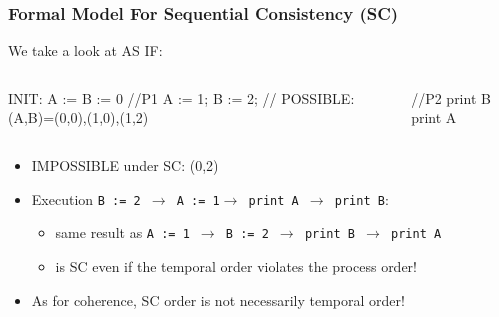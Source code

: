 \documentclass{beamer}
\renewcommand{\emph}[1]{\textcolor{structure}{#1}}
\newcommand{\emp}[1]{\textcolor{DikuRed}{ #1}}
\begin{document}
\begin{frame}[fragile,t]
\frametitle{Formal Model For Sequential Consistency (SC)}

\begin{block}{We take a look at AS IF:}
\begin{columns}
\vspace{-2ex}
\begin{colorcode}[fontsize=\scriptsize]
        INIT: A := B := 0
//P1
A := 1;
B := 2;
// POSSIBLE: (A,B)=(0,0),(1,0),(1,2)
\end{colorcode} 
\vspace{-2ex}
\begin{colorcode}[fontsize=\scriptsize]

//P2
print B
print A

\end{colorcode} 
\end{columns}
\end{block}

\begin{itemize}
    \item \alert{IMPOSSIBLE under SC: (0,2)}\bigskip
    \item \emph{Execution {\tt B := 2 $\rightarrow$ A := 1$ \rightarrow$ print A $\rightarrow$ print B}}:    
    \begin{itemize}
        \item same result as {\tt A := 1 $\rightarrow$ B := 2 $\rightarrow$ print B $\rightarrow$ print A}\medskip
        \item \emph{is SC even if the temporal order violates the process order!}
    \end  {itemize}\bigskip

    \item \emp{As for coherence, SC order is not necessarily temporal order!}
\end{itemize}

\end{frame}
\end{document}
